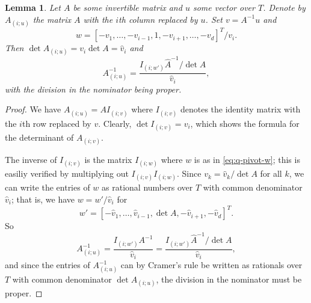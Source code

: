 \documentclass[a4paper,twocolumn]{article}
\newtheorem{lemma}[theorem]{Lemma}
\begin{document}
\begin{lemma}
  Let $A$ be some invertible matrix and $u$ some vector over $T$.
  Denote by $A_{(i;u)}$ the matrix $A$ with the $i$th column replaced
  by $u$.  Set $v=A^{-1} u$ and
  \begin{equation}
    \label{eq:q-pivot-w}
    w = [-v_1, \ldots, -v_{i-1}, 1, -v_{i+1}, \ldots, -v_d ]^T / v_i.
  \end{equation}
  Then $\det A_{(i;u)} = v_i \det{A} = \hat{v}_i$ and
  \[
  A_{(i;u)}^{-1} = \frac{I_{(i;w')} \hat{A}^{-1} /\det{A}}{\hat{v}_i},
  \]
  with the division in the nominator being proper.
\end{lemma}
%
\begin{proof}
  We have $A_{(i;u)} = A I_{(i;v)}$ where $I_{(i;v)}$ denotes the
  identity matrix with the $i$th row replaced by $v$.  Clearly, $\det
  I_{(i;v)} = v_i$, which shows the formula for the determinant of
  $A_{(i;v)}$.

  The inverse of $I_{(i;v)}$ is the matrix $I_{(i;w)}$ where $w$ is as
  in \eqref{eq:q-pivot-w}; this is easiliy verified by multiplying out
  $I_{(i;v)} I_{(i;w)}$.  Since $v_k = \hat{v}_k/\det{A}$ for all $k$,
  we can write the entries of $w$ as rational numbers over $T$ with
  common denominator $\hat{v}_i$; that is, we have $w = w'/\hat{v}_i$
  for
  \[
  w' = [-\hat{v}_1,\ldots,\hat{v}_{i-1},\det{A},-\hat{v}_{i+1},-\hat{v}_d]^T.
  \]
  So 
  \[
  A_{(i;u)}^{-1} = \frac{I_{(i;w')} A^{-1}}{\hat{v}_i} = 
  \frac{I_{(i;w')} \hat{A}^{-1} /\det{A}}{\hat{v}_i},
  \]
  and since the entries of $A_{(i;u)}^{-1}$ can by Cramer's rule be
  written as rationals over $T$ with common denominator
  $\det{A_{(i;u)}}$, the division in the nominator must be proper.
\end{proof}
%

\end{document}
